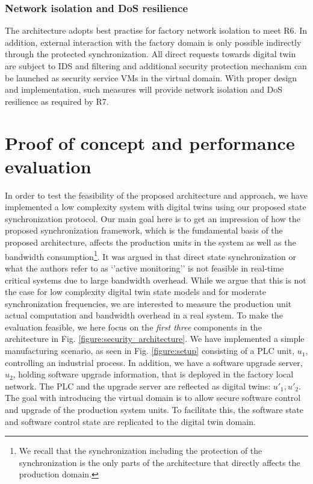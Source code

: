 \subsubsection{Network isolation and DoS resilience}
The architecture adopts best practise for factory network isolation \cite{NISTICS2015} to meet R6. In addition, external interaction with the factory domain is only possible indirectly through the protected synchronization. All direct requests towards digital twin are subject to IDS and filtering and additional security protection mechanism can be launched as security service VMs in the virtual domain. With proper design and implementation, such measures will provide network isolation and DoS resilience as required by R7.

\section{Proof of concept and performance evaluation}
\label{analysis:manufacturing_example}
In order to test the feasibility of the proposed architecture and approach, we have implemented a low complexity system with digital twins using our proposed state synchronization protocol. Our main goal here is to get an impression of how the proposed synchronization framework, which is the fundamental basis of the proposed architecture, affects the production units in the system as well as the bandwidth consumption\footnote{We recall that the synchronization including the protection of the synchronization is the only parts of the architecture that directly affects the production domain.}. It was argued in \cite{Eckhart2018} that direct state synchronization or what the authors refer to as ‘’active monitoring’’ is not feasible in real-time critical systems due to large bandwidth overhead. While we argue that this is not the case for low complexity digital twin state models and for moderate synchronization frequencies, we are interested to measure the production unit actual computation and bandwidth overhead in a real system. To make the evaluation feasible, we here focus on the {\it first three} components in the architecture in Fig. \ref{figure:security_architecture}.  We have implemented a simple manufacturing scenario, as seen in Fig. \ref{figure:setup} consisting of a PLC unit, $u_1$, controlling an industrial process. In addition, we have a software upgrade server, $u_2$, holding software upgrade information, that is deployed in the factory local network. The PLC and the upgrade server are reflected as digital twins: $u'_1, u'_2$. The goal with introducing the virtual domain is to allow secure software control and upgrade of the production system units. To facilitate this, the software state and software control state are replicated to the digital twin domain. 


